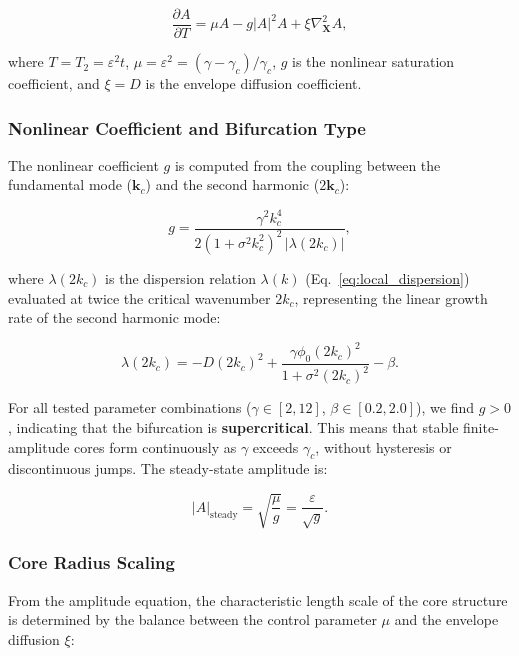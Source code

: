 \documentclass[sn-nature,pdflatex]{sn-jnl}
\begin{document}
\begin{equation}
\label{eq:gl_equation}
\frac{\partial A}{\partial T} = \mu A - g |A|^2 A + \xi \nabla_{\mathbf{X}}^2 A,
\end{equation}

where $T = T_2 = \varepsilon^2 t$, $\mu = \varepsilon^2 = (\gamma - \gamma_c)/\gamma_c$, $g$ is the nonlinear saturation coefficient, and $\xi = D$ is the envelope diffusion coefficient.

\subsubsection{Nonlinear Coefficient and Bifurcation Type}

The nonlinear coefficient $g$ is computed from the coupling between the fundamental mode ($\mathbf{k}_c$) and the second harmonic ($2\mathbf{k}_c$):

\begin{equation}
\label{eq:g_coefficient}
g = \frac{\gamma^2 k_c^4}{2 (1 + \sigma^2 k_c^2)^2 \, |\lambda(2k_c)|},
\end{equation}

where $\lambda(2k_c)$ is the dispersion relation $\lambda(k)$ (Eq.~\ref{eq:local_dispersion}) evaluated at twice the critical wavenumber $2k_c$, representing the linear growth rate of the second harmonic mode:

\begin{equation}
\lambda(2k_c) = -D(2k_c)^2 + \frac{\gamma \phi_0 (2k_c)^2}{1 + \sigma^2 (2k_c)^2} - \beta.
\end{equation}

For all tested parameter combinations ($\gamma \in [2, 12]$, $\beta \in [0.2, 2.0]$), we find $g > 0$, indicating that the bifurcation is \textbf{supercritical}. This means that stable finite-amplitude cores form continuously as $\gamma$ exceeds $\gamma_c$, without hysteresis or discontinuous jumps. The steady-state amplitude is:

\begin{equation}
|A|_{\text{steady}} = \sqrt{\frac{\mu}{g}} = \frac{\varepsilon}{\sqrt{g}}.
\end{equation}

\subsubsection{Core Radius Scaling}

From the amplitude equation, the characteristic length scale of the core structure is determined by the balance between the control parameter $\mu$ and the envelope diffusion $\xi$:
\end{document}
